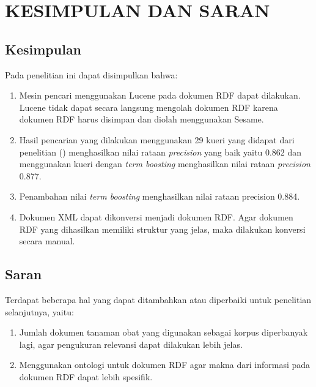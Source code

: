 \section*{KESIMPULAN DAN SARAN}
\subsection*{Kesimpulan}
Pada penelitian ini dapat disimpulkan bahwa:
\begin{enumerate}[noitemsep]
\item Mesin pencari menggunakan Lucene pada dokumen RDF dapat dilakukan. Lucene tidak dapat secara langsung mengolah dokumen RDF karena dokumen RDF harus disimpan dan diolah menggunakan Sesame.
\item Hasil pencarian yang dilakukan menggunakan 29 kueri yang didapat dari penelitian \citeauthor{HERAWAN} (\cite*{HERAWAN}) menghasilkan nilai rataan \textit{precision} yang baik yaitu 0.862 dan menggunakan kueri dengan \textit{term boosting} menghasilkan nilai rataan \textit{precision} 0.877.
\item Penambahan nilai \textit{term boosting} menghasilkan nilai rataan precision 0.884.
\item Dokumen XML dapat dikonversi menjadi dokumen RDF. Agar dokumen RDF yang dihasilkan memiliki struktur yang jelas, maka dilakukan konversi secara manual.
\end{enumerate}

\subsection*{Saran}
Terdapat beberapa hal yang dapat ditambahkan atau diperbaiki untuk penelitian selanjutnya, yaitu:
\begin{enumerate}[noitemsep]
\item Jumlah dokumen tanaman obat yang digunakan sebagai korpus diperbanyak lagi, agar pengukuran relevansi dapat dilakukan lebih jelas.
\item Menggunakan ontologi untuk dokumen RDF agar makna dari informasi pada dokumen RDF dapat lebih spesifik.
\end{enumerate}
